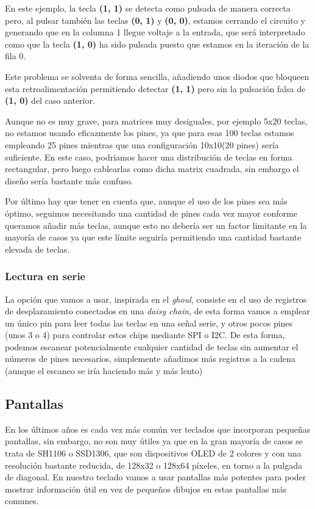     En este ejemplo, la tecla \textbf{(1, 1)} se detecta como pulsada de manera correcta pero, al pulsar también las teclas \textbf{(0, 1)} y \textbf{(0, 0)}, estamos cerrando el circuito y generando que en la columna 1 llegue voltaje a la entrada, que será interpretado como que la tecla \textbf{(1, 0)} ha sido pulsada puesto que estamos en la iteración de la fila 0.\vspace{0.2cm}\par

    Este problema se solventa de forma sencilla, añadiendo unos diodos que bloqueen esta retroalimentación permitiendo detectar \textbf{(1, 1)} pero sin la pulsación falsa de \textbf{(1, 0)} del caso anterior.

    Aunque no es muy grave, para matrices muy desiguales, por ejemplo 5x20 teclas, no estamos usando eficazmente los pines, ya que para esas 100 teclas estamos empleando 25 pines mientras que una configuración 10x10(20 pines) sería suficiente. \newline
    En este caso, podriamos hacer una distribución de teclas en forma rectangular, pero luego cablearlas como dicha matrix cuadrada, sin embargo el diseño sería bastante más confuso. \par

    Por último hay que tener en cuenta que, aunque el uso de los pines sea más óptimo, seguimos necesitando una cantidad de pines cada vez mayor conforme queramos añadir más teclas, aunque esto no debería ser un factor limitante en la mayoría de casos ya que este límite seguiría permitiendo una cantidad bastante elevada de teclas.

    \subsubsection{Lectura en serie}
    La opción que vamos a usar, inspirada en el \textit{ghoul}\cite{ghoul}, consiste en el uso de registros de desplazamiento conectados en una \textit{daisy chain}, de esta forma vamos a emplear un único pin para leer todas las teclas en una señal serie, y otros pocos pines (unos 3 o 4) para controlar estos chips mediante SPI\cite{spi} o I2C\cite{i2c}. De esta forma, podemos escanear potencialmente cualquier cantidad de teclas sin aumentar el números de pines necesarios, simplemente añadimos más registros a la cadena (aunque el escaneo se iría haciendo más y más lento)

\subsection{Pantallas}
En los últimos años es cada vez más común ver teclados que incorporan pequeñas pantallas, sin embargo, no son muy útiles ya que en la gran mayoría de casos se trata de SH1106 o SSD1306, que son dispositivos OLED de 2 colores y con una resolución bastante reducida, de 128x32 o 128x64 píxeles, en torno a la pulgada de diagonal. En nuestro teclado vamos a usar pantallas más potentes para poder mostrar información útil en vez de pequeños dibujos en estas pantallas más comunes.

